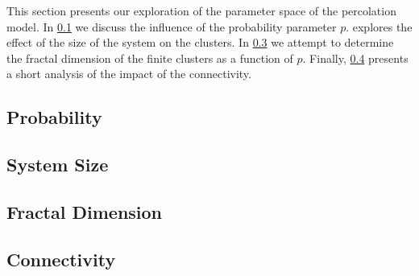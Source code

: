 This section presents our exploration of the parameter space of the percolation model. In \cref{ss:exp:probability} we discuss the influence of the probability parameter $p$.  explores the effect of the size of the system on the clusters. In \cref{ss:exp:fractal} we attempt to determine the fractal dimension of the finite clusters as a function of $p$. Finally, \cref{ss:exp:connectivity} presents a short analysis of the impact of the connectivity.


\subsection{Probability}
\label{ss:exp:probability}


\subsection{System Size}
\label{ss:exp:systemSize}


\subsection{Fractal Dimension}
\label{ss:exp:fractal}
	

\subsection{Connectivity}
\label{ss:exp:connectivity}

